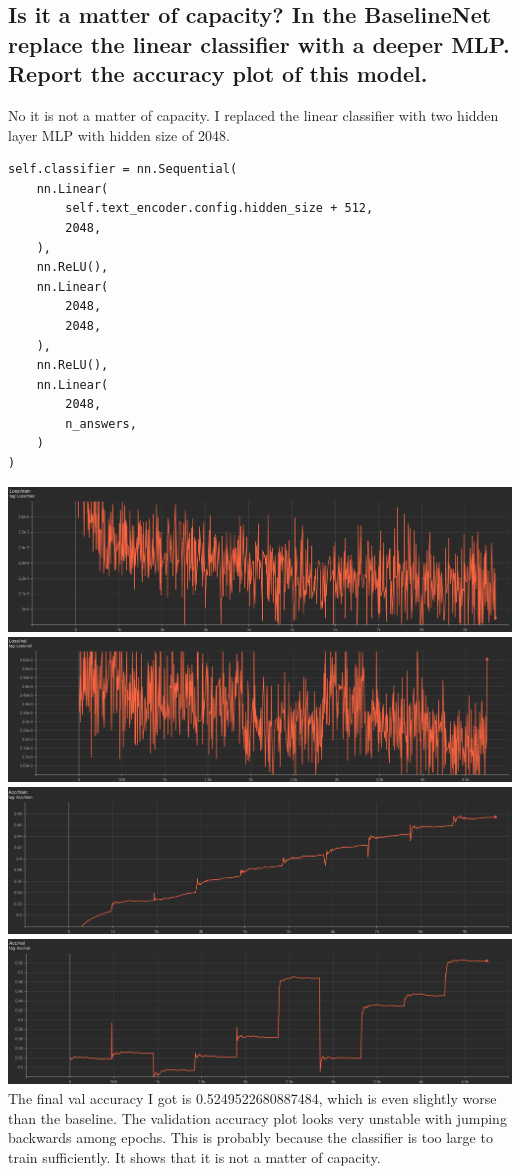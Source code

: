 \documentclass{article}
\begin{document}
\subsection{Is it a matter of capacity? In the BaselineNet replace the linear classifier with a deeper MLP. Report the accuracy plot of this model.}
No it is not a matter of capacity. I replaced the linear classifier with two hidden layer MLP with hidden size of 2048.
\begin{lstlisting}
self.classifier = nn.Sequential(
    nn.Linear(
        self.text_encoder.config.hidden_size + 512,
        2048,
    ),
    nn.ReLU(),
    nn.Linear(
        2048,
        2048,
    ),
    nn.ReLU(),
    nn.Linear(
        2048,
        n_answers,
    )
)
\end{lstlisting}
\includegraphics[width=\textwidth]{q4.1_1.png}
\includegraphics[width=\textwidth]{q4.1_2.png}
\includegraphics[width=\textwidth]{q4.1_3.png}
\includegraphics[width=\textwidth]{q4.1_4.png}
The final val accuracy I got is 0.5249522680887484, which is even slightly worse than the baseline. The validation accuracy plot looks very unstable with jumping backwards among epochs. This is probably because the classifier is too large to train sufficiently. It shows that it is not a matter of capacity.
\end{document}
